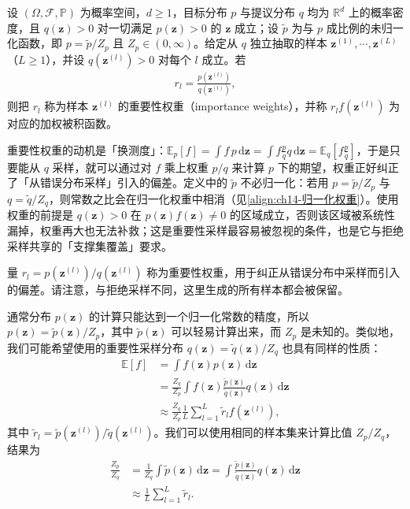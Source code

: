 \documentclass[../../main.tex]{subfiles}
\begin{document}
\begin{definition}[重要性权重]\label{definition:ch14-重要性权重}
设 $(\Omega,\mathcal{F},\mathbb{P})$ 为概率空间，$d\geqslant1$，目标分布 $p$ 与提议分布 $q$ 均为 $\mathbb{R}^{d}$ 上的概率密度，且 $q(\bm{z})>0$ 对一切满足 $p(\bm{z})>0$ 的 $\bm{z}$ 成立；设 $\widetilde{p}$ 为与 $p$ 成比例的未归一化函数，即 $p=\widetilde{p}/Z_{p}$ 且 $Z_{p}\in(0,\infty)$。给定从 $q$ 独立抽取的样本 $\bm{z}^{(1)},\cdots,\bm{z}^{(L)}$（$L\geqslant1$），并设 $q(\bm{z}^{(l)})>0$ 对每个 $l$ 成立。若
\begin{align*}
r_{l}=\frac{p\!\left(\bm{z}^{(l)}\right)}{q\!\left(\bm{z}^{(l)}\right)},
\end{align*}
则把 $r_{l}$ 称为样本 $\bm{z}^{(l)}$ 的重要性权重（importance weights），并称 $r_{l}f(\bm{z}^{(l)})$ 为对应的加权被积函数。
\end{definition}

\begin{remark}重要性权重的动机是「换测度」：$\mathbb{E}_{p}[f]=\int f\,p\,\mathrm{d}\bm{z}=\int f\frac{p}{q}q\,\mathrm{d}\bm{z}=\mathbb{E}_{q}\left[f\frac{p}{q}\right]$，于是只要能从 $q$ 采样，就可以通过对 $f$ 乘上权重 $p/q$ 来计算 $p$ 下的期望，权重正好纠正了「从错误分布采样」引入的偏差。定义中的 $\widetilde{p}$ 不必归一化：若用 $p=\widetilde{p}/Z_{p}$ 与 $q=\widetilde{q}/Z_{q}$，则常数之比会在归一化权重中相消（见\eqref{align:ch14-归一化权重}）。使用权重的前提是 $q(\bm{z})>0$ 在 $p(\bm{z})f(\bm{z})\neq0$ 的区域成立，否则该区域被系统性漏掉，权重再大也无法补救；这是重要性采样最容易被忽视的条件，也是它与拒绝采样共享的「支撑集覆盖」要求。
\end{remark}

量 $r_{l}=p\!\left(\bm{z}^{(l)}\right)/q\!\left(\bm{z}^{(l)}\right)$ 称为重要性权重，用于纠正从错误分布中采样而引入的偏差。请注意，与拒绝采样不同，这里生成的所有样本都会被保留。

通常分布 $p(\bm{z})$ 的计算只能达到一个归一化常数的精度，所以 $p(\bm{z})=\widetilde{p}(\bm{z})/Z_{p}$，其中 $\widetilde{p}(\bm{z})$ 可以轻易计算出来，而 $Z_{p}$ 是未知的。类似地，我们可能希望使用的重要性采样分布 $q(\bm{z})=\widetilde{q}(\bm{z})/Z_{q}$ 也具有同样的性质：
\begin{align}
\mathbb{E}[f]&=\int f(\bm{z})p(\bm{z})\,\mathrm{d}\bm{z}\nonumber\\
&=\frac{Z_{q}}{Z_{p}}\int f(\bm{z})\frac{\widetilde{p}(\bm{z})}{\widetilde{q}(\bm{z})}q(\bm{z})\,\mathrm{d}\bm{z}\nonumber\\
&\approx\frac{Z_{q}}{Z_{p}}\frac{1}{L}\sum_{l=1}^{L}\tilde{r}_{l}f\!\left(\bm{z}^{(l)}\right),
\label{align:ch14-重要性采样归一化}
\end{align}
其中 $\tilde{r}_{l}=\widetilde{p}\!\left(\bm{z}^{(l)}\right)/\widetilde{q}\!\left(\bm{z}^{(l)}\right)$。我们可以使用相同的样本集来计算比值 $Z_{p}/Z_{q}$，结果为
\begin{align}
\frac{Z_{p}}{Z_{q}}&=\frac{1}{Z_{q}}\int\widetilde{p}(\bm{z})\,\mathrm{d}\bm{z}=\int\frac{\widetilde{p}(\bm{z})}{\widetilde{q}(\bm{z})}q(\bm{z})\,\mathrm{d}\bm{z}\nonumber\\
&\approx\frac{1}{L}\sum_{l=1}^{L}\tilde{r}_{l}.
\label{align:ch14-归一化常数比}
\end{align}
\end{document}
